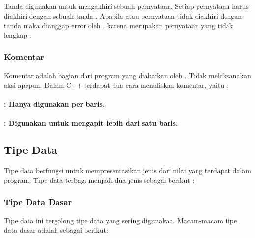 \documentclass[../main.tex]{subfiles}
\begin{document}
    \subsubsection{{\Semicolon}}
    \begin{indentlevel0}
        Tanda {\semicolon}  digunakan untuk mengakhiri sebuah pernyataan. Setiap pernyataan harus diakhiri dengan sebuah tanda {\semicolon}. Apabila {\statement} atau pernyataan tidak diakhiri dengan tanda {\semicolon} maka dianggap error oleh {\compiler}, karena merupakan pernyataan yang tidak lengkap \parencite{kadir2005heriyanto}.
    \end{indentlevel0}

    \subsubsection{Komentar}
    \begin{indentlevel0}
        Komentar adalah bagian dari program yang diabaikan oleh {\compiler}. Tidak melaksanakan aksi apapun. Dalam C++ terdapat dua cara menuliskan komentar, yaitu \parencite{kadir2005heriyanto}:
    \end{indentlevel0}
    \paragraph{: Hanya digunakan per baris.}
    \paragraph{: Digunakan untuk mengapit lebih dari satu baris.}

    \subsection{Tipe Data}
    Tipe data berfungsi untuk mempresentasikan jenis dari nilai yang terdapat dalam program. Tipe data terbagi menjadi dua jenis sebagai berikut \parencite{friyadi2005panduan}:

    \subsubsection{Tipe Data Dasar}
    \begin{indentlevel0}
        Tipe data ini tergolong tipe data yang sering digunakan. Macam-macam tipe data dasar adalah sebagai berikut:
    \end{indentlevel0}
    \vspace{-1ex}
\end{document}
